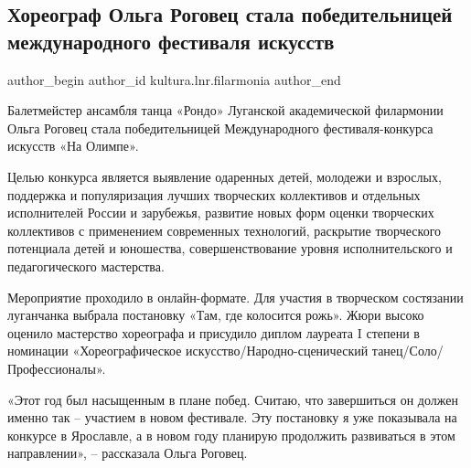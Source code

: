  
 
 
 
 
\subsection{Хореограф Ольга Роговец стала победительницей международного фестиваля искусств}
\label{sec:24_12_2021.stz.kultura.lnr.filarmonia.1.olga_rogovec_horeograf}

\ifcmt
 author_begin
   author_id kultura.lnr.filarmonia
 author_end
\fi


\begin{zznagolos}
Балетмейстер ансамбля танца «Рондо» Луганской академической филармонии Ольга
Роговец стала победительницей Международного фестиваля-конкурса искусств «На
Олимпе».
\end{zznagolos}

Целью конкурса является выявление одаренных детей, молодежи и взрослых,
поддержка и популяризация лучших творческих коллективов и отдельных
исполнителей России и зарубежья, развитие новых форм оценки творческих
коллективов с применением современных технологий, раскрытие творческого
потенциала детей и юношества, совершенствование уровня исполнительского и
педагогического мастерства.

Мероприятие проходило в онлайн-формате. Для участия в творческом состязании
луганчанка выбрала постановку «Там, где колосится рожь». Жюри высоко оценило
мастерство хореографа и присудило диплом лауреата I степени в номинации
«Хореографическое искусство/Народно-сценический танец/Соло/Профессионалы».

\begin{zznagolos}
«Этот год был насыщенным в плане побед. Считаю, что завершиться он должен
именно так – участием в новом фестивале. Эту постановку я уже показывала
на конкурсе в Ярославле, а в новом году планирую продолжить развиваться в
этом направлении», – рассказала Ольга Роговец.
\end{zznagolos}
